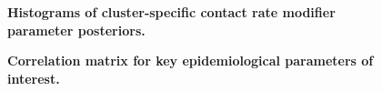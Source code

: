 \begin{figure}[ht]
    \caption{\textbf{Histograms of cluster-specific contact rate modifier parameter posteriors.}}
\end{figure}

\begin{figure}[ht]
    \caption{\textbf{Correlation matrix for key epidemiological parameters of interest.}}
\end{figure}

